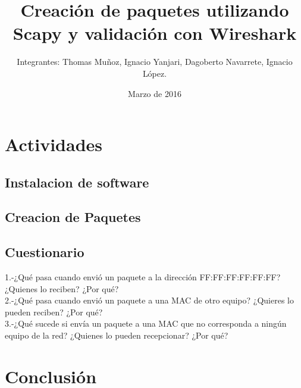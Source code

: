 \documentclass{udpreport}
\title{Creación de paquetes utilizando Scapy y validación con Wireshark}
\author{Integrantes: Thomas Muñoz, Ignacio Yanjari, Dagoberto Navarrete, Ignacio López.}
\date{Marzo de 2016}
\begin{document}
\maketitle
\tableofcontents
\chapter{Actividades}
	\section{Instalacion de software}

	\section{Creacion de Paquetes}
		
	\section{Cuestionario}
	
	  1.-¿Qué pasa cuando envió un paquete a la dirección FF:FF:FF:FF:FF:FF? ¿Quienes
	     lo reciben? ¿Por qué?\\
	     
	  2.-¿Qué pasa cuando envió un paquete a una MAC de otro equipo? ¿Quieres lo
	      pueden reciben? ¿Por qué?\\
	      
	  3.-¿Qué sucede si envía un paquete a una MAC que no corresponda a ningún equipo
	      de la red? ¿Quienes lo pueden recepcionar? ¿Por qué?\\
	      

\chapter{Conclusión}
  
\begin{thebibliography}{x}

\end{thebibliography}
\end{document}
